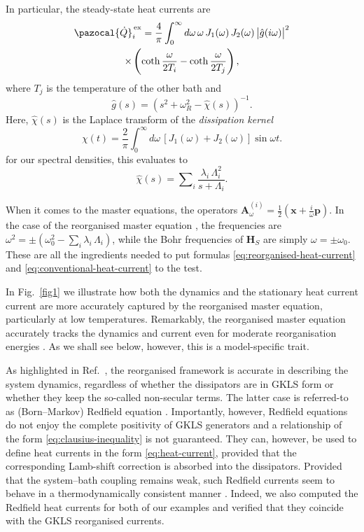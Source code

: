 \documentclass[aps,pra,superscriptaddress,twocolumn,nofootinbib]{revtex4-2}
\begin{document}
In particular, the steady-state heat currents are \cite{freitas2014}
\begin{multline}\label{eq:hc-ex-osc}
	\pazocal{\dot Q}^\text{\,ex}_i = \frac{4}{\pi} \int_0^\infty d\omega \, \omega \, J_1(\omega)\, J_2(\omega)\,\abs{\hat{g}(i \omega)}^2 \\\times \left( \coth{\frac{\omega}{2 T_i}}-\coth{\frac{\omega}{2 T_j}}\right),
\end{multline}
where $T_j$ is the temperature of the other bath and 
\begin{equation*}
	\hat{g}(s)=\left( s^2 + \omega_R^2  - \widehat{\chi}(s)\right)^{-1}.
\end{equation*}
Here, $\widehat{\chi}(s)$ is the Laplace transform of the \textit{dissipation kernel}
\begin{equation*}
	\chi(t) = \frac{2}{\pi} \int_0^\infty d\omega\, \left[ J_1(\omega) + J_2(\omega) \right] \sin{\omega t}.
\end{equation*}
for our spectral densities, this evaluates to
\begin{equation*}\label{eq:covariance-matrix-general}
	\widehat{\chi}(s) =  \sum\nolimits_i\frac{\lambda_i\, \Lambda_i^2}{s + \Lambda_i}.
\end{equation*} 

When it comes to the master equations, the operators $\pmb{A}_\omega^{(i)} = \frac12(\pmb{x}+\frac{i}{\omega}\pmb{p})$. In the case of the reorganised master equation , the frequencies are $\omega^2 = \pm (\omega_0^2-\sum\nolimits_i\lambda_i\,\Lambda_i)$, while the Bohr frequencies of $ \pmb{H}_S $ are simply $\omega = \pm \omega_0$. These are all the ingredients needed to put formulas \eqref{eq:reorganised-heat-current} and \eqref{eq:conventional-heat-current} to the test.

In Fig.~\ref{fig1} we illustrate how both the dynamics and the stationary heat current current are more accurately captured by the reorganised master equation, particularly at low temperatures. Remarkably, the reorganised master equation accurately tracks the dynamics and current even for moderate reorganisation energies \cite{correa2023}. As we shall see below, however, this is a model-specific trait. 

As highlighted in Ref.~\cite{correa2023}, the reorganised framework is accurate in describing the system dynamics, regardless of whether the dissipators are in GKLS form or whether they keep the so-called non-secular terms. The latter case is referred-to as (Born--Markov) Redfield equation \cite{redfield1957}. Importantly, however, Redfield equations do not enjoy the complete positivity of GKLS generators and a relationship of the form \eqref{eq:clausius-inequality} is not guaranteed. They can, however, be used to define heat currents in the form \eqref{eq:heat-current}, provided that the corresponding Lamb-shift correction is absorbed into the dissipators. Provided that the system--bath coupling remains weak, such Redfield currents seem to behave in a thermodynamically consistent manner \cite{strasberg2016}. Indeed, we also computed the Redfield heat currents for both of our examples and verified that they coincide with the GKLS reorganised currents.
\end{document}
